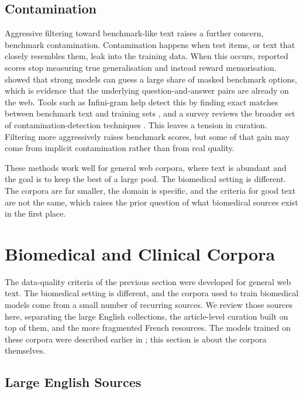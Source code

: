 \subsection{Contamination}

Aggressive filtering toward benchmark-like text raises a further concern, benchmark
contamination. Contamination happens when test items, or text that closely resembles them,
leak into the training data. When this occurs, reported scores stop measuring true
generalisation and instead reward memorisation. \citet{deng2024benchmarkprobing} showed that
strong models can guess a large share of masked benchmark options, which is evidence that the
underlying question-and-answer pairs are already on the web. Tools such as Infini-gram help
detect this by finding exact matches between benchmark text and training sets
\citep{liu2024infinigram}, and a survey reviews the broader set of contamination-detection
techniques \citep{xu2024contaminationsurvey}. This leaves a tension in curation.
Filtering more aggressively raises benchmark scores, but some of that gain may come from
implicit contamination rather than from real quality.

These methods work well for general web corpora, where text is abundant and the goal is to
keep the best of a large pool. The biomedical setting is different. The corpora are far
smaller, the domain is specific, and the criteria for good text are not the same, which
raises the prior question of what biomedical sources exist in the first place.
\section{Biomedical and Clinical Corpora}
\label{sec:corpus-biomed}

The data-quality criteria of the previous section were developed for general web text. The
biomedical setting is different, and the corpora used to train biomedical models come from a
small number of recurring sources. We review those sources here, separating the large
English collections, the article-level curation built on top of them, and the more
fragmented French resources. The models trained on these corpora were described earlier in
; this section is about the corpora themselves.

\subsection{Large English Sources}

